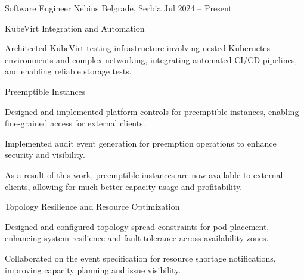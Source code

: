 

\begin{cventries}
  \cventry
  {Software Engineer} %
  {Nebius} %
  {Belgrade, Serbia} %
  {Jul 2024 -- Present} %
  {
    \begin{cvitems} %
        \item{KubeVirt Integration and Automation}
        \begin{cvitemsnested}
        \item{Architected KubeVirt testing infrastructure involving nested Kubernetes environments and complex networking, integrating automated CI/CD pipelines, and enabling reliable storage tests.}
        \end{cvitemsnested}
        \item{Preemptible Instances}
        \begin{cvitemsnested}
        \item{Designed and implemented platform controls for preemptible instances, enabling fine-grained access for external clients.}
        \item{Implemented audit event generation for preemption operations to enhance security and visibility.}
        \item{As a result of this work, preemptible instances are now available to external clients, allowing for much better capacity usage and profitability.}
        \end{cvitemsnested}
        \item{Topology Resilience and Resource Optimization}
        \begin{cvitemsnested}
        \item{Designed and configured topology spread constraints for pod placement, enhancing system resilience and fault tolerance across availability zones.}
        \item{Collaborated on the event specification for resource shortage notifications, improving capacity planning and issue visibility.}
        \end{cvitemsnested}

\end{cvitems}}
\end{cventries}
